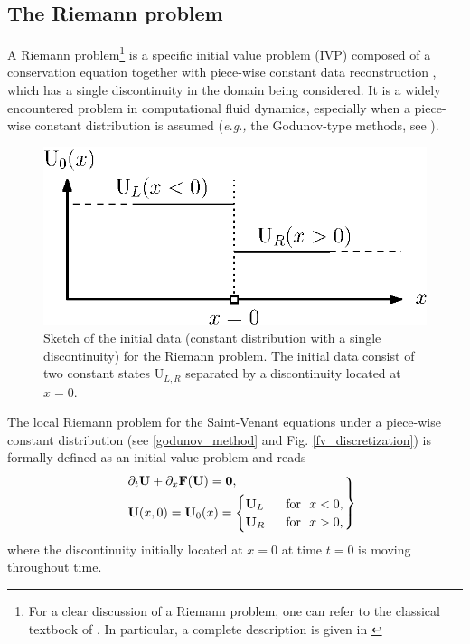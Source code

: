 \documentclass[a4paper]{article}
\numberwithin{equation}{section}
\newcommand{\eg}{\textit{e.g.,} }
\begin{document}
	\subsection{The Riemann problem}\label{riemann_problem_section}
	A Riemann problem\footnote{For a clear discussion of a Riemann problem, one can refer to the classical textbook of \cite{toro2013}. In particular, a complete description is given in \cite[see pp. 49, chap. 2.2 The Linear Advection Equation]{toro2013}} is a specific initial value problem (IVP) composed of a conservation equation together with piece-wise constant data reconstruction \parencite{godunov1959}, which has a single discontinuity in the domain being considered. It is a widely encountered problem in computational fluid dynamics, especially when a piece-wise constant distribution is assumed (\eg the Godunov-type methods, see \cite{guinot2012,toro2013}). 
	\begin{figure}[htbp]
		\centering
		\includegraphics[scale=0.75]{imgs/riemann_problem.eps}
		\caption{Sketch of the initial data (constant distribution with a single discontinuity) for the Riemann problem. The initial data consist of two constant states $\mathrm{U}_{L,R}$ separated by a discontinuity located at $x = 0$.}
		\label{riemann_problem_scheme}
	\end{figure}
	
	The local Riemann problem for the Saint-Venant equations under a piece-wise constant distribution (see \ref{godunov_method} and Fig. \ref{fv_discretization}) is formally defined as an initial-value problem and reads
	\begin{align}
	\begin{rcases}
		\label{riemann_problem}
		&\partial_t \mathbf{U}+\partial_x \mathbf{F(U)} = \mathbf{0},\\
		&\mathbf{U}(x,0)=\mathbf{U}_0(x)=
		\begin{cases}
			\mathbf{U}_L  &\,\,\,\, \mathrm{for} \,\,\,\, x<0,\\
			\mathbf{U}_R  &\,\,\,\, \mathrm{for} \,\,\,\, x>0,\\
		\end{cases}
	\end{rcases} 
	\end{align}
	where the discontinuity initially located at $x=0$ at time $t=0$ is moving throughout time. 
	
\end{document}
